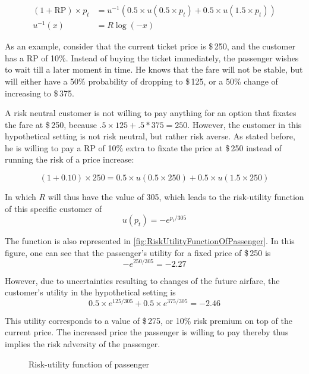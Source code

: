 \begin{align*}
    (1 + \mbox{RP}) \times p_t &= u^{-1}(0.5 \times u(0.5 \times p_t) + 0.5 \times u(1.5 \times p_t)) \\
    u^{-1}(x) &= R \log(-x)
\end{align*}

As an example, consider that the current ticket price is \$\,250, and the customer has a $\mbox{RP}$ of 10\%. Instead of buying the ticket immediately, the passenger wishes to wait till a later moment in time. He knows that the fare will not be stable, but will either have a 50\% probability of dropping to \$\,125, or a 50\% change of increasing to \$\,375.

A risk neutral customer is not willing to pay anything for an option that fixates the fare at \$\,250, because $.5 \times 125 + .5 * 375 = 250$. However, the customer in this hypothetical setting is not risk neutral, but rather risk averse. As stated before, he is willing to pay a $\mbox{RP}$ of 10\% extra to fixate the price at \$\,250 instead of running the risk of a price increase:

$$
(1 + 0.10) \times 250 = 0.5 \times u(0.5 \times 250) + 0.5 \times u(1.5 \times 250)
$$

In which $R$ will thus have the value of 305, which leads to the risk-utility function of this specific customer of
$$ u(p_t) = -e^{p_t/305} $$

The function is also represented in \autoref{fig:RiskUtilityFunctionOfPassenger}. In this figure, one can see that the passenger's utility for a fixed price of \$\,250 is
$$ -e^{250/305} = -2.27$$

However, due to uncertainties resulting to changes of the future airfare, the customer's utility in the hypothetical setting is
$$0.5 \times e^{125/305}+0.5 \times e^{375/305} = -2.46$$

This utility corresponds to a value of \$\,275, or 10\% risk premium on top of the current price. The increased price the passenger is willing to pay thereby thus implies the risk adversity of the passenger.

\begin{figure}
    \centering
    \caption{Risk-utility function of passenger}
    \label{fig:RiskUtilityFunctionOfPassenger}
\end{figure}

